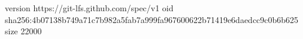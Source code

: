 version https://git-lfs.github.com/spec/v1
oid sha256:4b07138b749a71c7b982a5fab7a999fa967600622b71419e6daedcc9c0b6b625
size 22000
